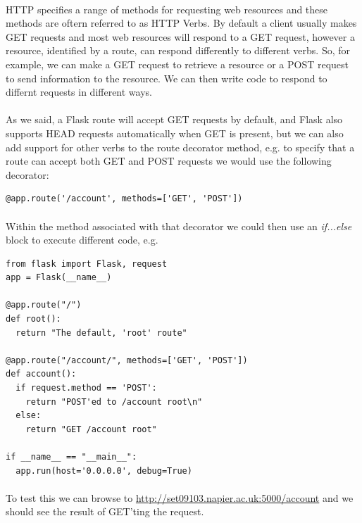 \documentclass[12pt, a4paper, oneside]{book}
\begin{document}
{\paragraph{} HTTP specifies a range of methods for requesting web resources and these methods are oftern referred to as HTTP Verbs. By default a client usually makes GET requests and most web resources will respond to a GET request, however a resource, identified by a route, can respond differently to different verbs. So, for example, we can make a GET request to retrieve a resource or a POST request to send information to the resource. We can then write code to respond to differnt requests in different ways.

\paragraph{} As we said, a Flask route will accept GET requests by default, and Flask also supports HEAD requests automatically when GET is present, but we can also add support for other verbs to the route decorator method, e.g. to specify that a route can accept both GET and POST requests we would use the following decorator:

\begin{lstlisting}
@app.route('/account', methods=['GET', 'POST'])
\end{lstlisting}

\paragraph{} Within the method associated with that decorator we could then use an \emph{if...else} block to execute different code, e.g. 

\begin{lstlisting}
from flask import Flask, request
app = Flask(__name__)

@app.route("/")
def root():
  return "The default, 'root' route"

@app.route("/account/", methods=['GET', 'POST'])
def account():
  if request.method == 'POST':
    return "POST'ed to /account root\n"
  else:
    return "GET /account root"

if __name__ == "__main__":
  app.run(host='0.0.0.0', debug=True)
\end{lstlisting}


\paragraph{} To test this we can browse to \url{http://set09103.napier.ac.uk:5000/account} and we should see the result of GET'ting the request.

}
\end{document}
